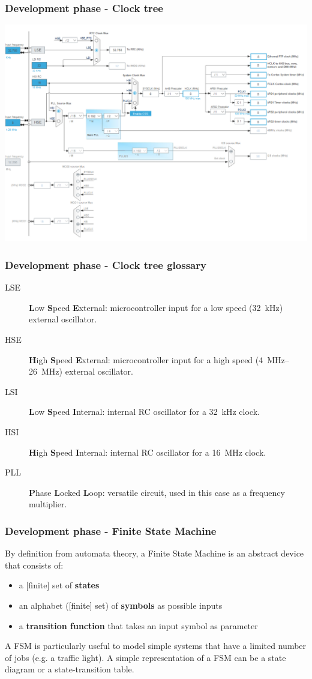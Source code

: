 \documentclass[11pt,xcolor=table,aspectratio=169]{beamer}
\begin{document}
	\begin{frame}
		\frametitle{Development phase - Clock tree}
		\centering\includegraphics[width=.68\textwidth]{media/clock_tree.png}
	\end{frame}

	\begin{frame}
		\frametitle{Development phase - Clock tree glossary}
		\begin{description}
			\item[LSE] \textbf{L}ow \textbf{S}peed \textbf{E}xternal: microcontroller input for a low speed (\SI{32}{\kilo\hertz}) external oscillator.
			\item[HSE] \textbf{H}igh \textbf{S}peed \textbf{E}xternal: microcontroller input for a high speed (\SIrange{4}{26}{\mega\hertz}) external oscillator.
			\item[LSI] \textbf{L}ow \textbf{S}peed \textbf{I}nternal: internal RC oscillator for a \SI{32}{\kilo\hertz} clock.
			\item[HSI] \textbf{H}igh \textbf{S}peed \textbf{I}nternal: internal RC oscillator for a \SI{16}{\mega\hertz} clock.
			\item[PLL] \textbf{P}hase \textbf{L}ocked \textbf{L}oop: versatile circuit, used in this case as a frequency multiplier.
		\end{description}
	\end{frame}

	\begin{frame}
		\frametitle{Development phase - Finite State Machine}
		By definition from automata theory, a Finite State Machine is an abstract device that consists of:
		\begin{itemize}
			\item a [finite] set of \textbf{states}
			\item an alphabet ([finite] set) of \textbf{symbols} as possible inputs
			\item a \textbf{transition function} that takes an input symbol as parameter
		\end{itemize}
		A FSM is particularly useful to model simple systems that have a limited number of jobs (e.g. a traffic light). A simple representation of a FSM can be a state diagram or a state-transition table.
	\end{frame}
\end{document}
